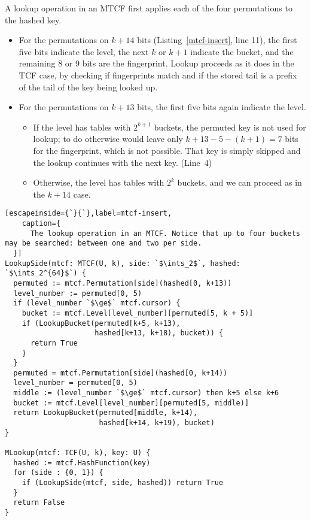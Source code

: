 \documentclass[sigconf, nonacm]{acmart}
\newcommand{\ints}{\mathbb{Z}}
\begin{document}
A lookup operation in an MTCF first applies each of the four permutations to the hashed key.
\begin{itemize}
\item For the permutations on $k + 14$ bits (Listing~\ref{mtcf-insert}, line 11), the first five bits indicate the level, the next $k$ or $k+1$ indicate the bucket, and the remaining 8 or 9 bits are the fingerprint.
Lookup proceeds as it does in the TCF case, by checking if fingerprints match and if the stored tail is a prefix of the tail of the key being looked up.
\item For the permutations on $k + 13$ bits, the first five bits again indicate the level.
\begin{itemize}
\item If the level has tables with $2^{k+1}$ buckets, the permuted key is not used for lookup; to do otherwise would leave only $k+13 - 5 - (k+1) = 7$ bits for the fingerprint, which is not possible.
That key is simply skipped and the lookup continues with the next key. (Line~4)
\item Otherwise, the level has tables with $2^k$ buckets, and we can proceed as in the $k+14$ case.
\end{itemize}
\end{itemize}

\begin{lstlisting}[escapeinside={`}{`},label=mtcf-insert,
    caption={
      The lookup operation in an MTCF. Notice that up to four buckets may be searched: between one and two per side.
  }]
LookupSide(mtcf: MTCF(U, k), side: `$\ints_2$`, hashed: `$\ints_2^{64}$`) {
  permuted := mtcf.Permutation[side](hashed[0, k+13))
  level_number := permuted[0, 5)
  if (level_number `$\ge$` mtcf.cursor) {
    bucket := mtcf.Level[level_number][permuted[5, k + 5)]
    if (LookupBucket(permuted[k+5, k+13),
                     hashed[k+13, k+18), bucket)) {
      return True
    }
  }
  permuted = mtcf.Permutation[side](hashed[0, k+14))
  level_number = permuted[0, 5)
  middle := (level_number `$\ge$` mtcf.cursor) then k+5 else k+6
  bucket := mtcf.Level[level_number][permuted[5, middle)]
  return LookupBucket(permuted[middle, k+14),
                      hashed[k+14, k+19), bucket)
}

MLookup(mtcf: TCF(U, k), key: U) {
  hashed := mtcf.HashFunction(key)
  for (side : {0, 1}) {
    if (LookupSide(mtcf, side, hashed)) return True
  }
  return False
}
\end{lstlisting}

\end{document}
